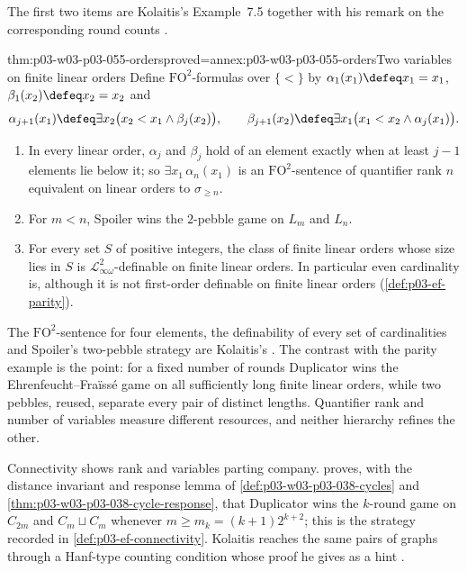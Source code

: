 The first two items are Kolaitis's Example~7.5 together with his remark on
the corresponding round counts
\cite[p.~56]{Kolaitis2003ExpressivePowerNotes}.

\begin{hbtheorem}{thm:p03-w03-p03-055-orders}{proved=annex:p03-w03-p03-055-orders}{Two variables on finite linear orders}
Define \(\mathrm{FO}^2\)-formulas over \(\{<\}\) by
\(\alpha_1(x_1)\defeq x_1=x_1\), \(\beta_1(x_2)\defeq x_2=x_2\) and
\[
 \alpha_{j+1}(x_1)\defeq\exists x_2\bigl(x_2<x_1\wedge\beta_j(x_2)\bigr),
 \qquad
 \beta_{j+1}(x_2)\defeq\exists x_1\bigl(x_1<x_2\wedge\alpha_j(x_1)\bigr).
\]
\begin{enumerate}
\item In every linear order, \(\alpha_j\) and \(\beta_j\) hold of an element
      exactly when at least \(j-1\) elements lie below it; so
      \(\exists x_1\,\alpha_n(x_1)\) is an \(\mathrm{FO}^2\)-sentence of
      quantifier rank \(n\) equivalent on linear orders to
      \(\sigma_{\ge n}\).
\item For \(m<n\), Spoiler wins the \(2\)-pebble game on \(L_m\) and
      \(L_n\).
\item For every set \(S\) of positive integers, the class of finite linear
      orders whose size lies in \(S\) is
      \(\mathcal L^2_{\infty\omega}\)-definable on finite linear orders. In
      particular even cardinality is, although it is not first-order
      definable on finite linear orders (\cref{def:p03-ef-parity}).
\end{enumerate}
\end{hbtheorem}

The \(\mathrm{FO}^2\)-sentence for four elements, the definability of every
set of cardinalities and Spoiler's two-pebble strategy are Kolaitis's
\cite[p.~53 and Example~7.6, p.~56]{Kolaitis2003ExpressivePowerNotes}. The
contrast with the parity example is the point: for a fixed number of rounds
Duplicator wins the Ehrenfeucht--Fra\"iss\'e game on all sufficiently long
finite linear orders, while two pebbles, reused, separate every pair of
distinct lengths. Quantifier rank and number of variables measure different
resources, and neither hierarchy refines the other.

Connectivity shows rank and variables parting company.
 proves, with the distance invariant
and response lemma of \cref{def:p03-w03-p03-038-cycles} and
\cref{thm:p03-w03-p03-038-cycle-response}, that Duplicator wins the
\(k\)-round game on \(C_{2m}\) and \(C_m\sqcup C_m\) whenever
\(m\ge m_k=(k+1)2^{k+2}\); this is the strategy recorded in
\cref{def:p03-ef-connectivity}. Kolaitis reaches the same pairs of graphs
through a Hanf-type counting condition whose proof he gives as a hint
\cite[Thm.~3.26 and Props.~3.28--3.29, pp.~19--20]{Kolaitis2003ExpressivePowerNotes}.

